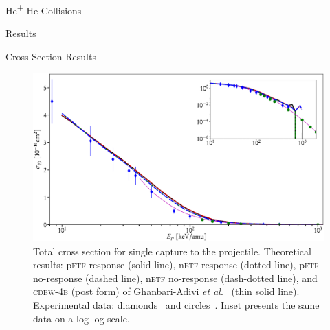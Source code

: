 \documentclass[a5paper, 9 pt]{extreport}
\begin{document}
\begin{chapter}{\texorpdfstring{He\textsuperscript{+}}{He+}-He Collisions \label{chap:hephe}}
\begin{section}{Results \label{sec:hephe-disc}}
\begin{subsection}{Cross Section Results \label{sec:hephe-res}}
         \begin{figure}[t]
            \centering
            \includegraphics[width = \linewidth]{./images/hephe-cross/HepHe-120.eps}
            \caption[Total cross section for single capture to the projectile He\textsuperscript{+}-He
                     collisions.]
                    {Total cross section for single capture to the projectile.
                     Theoretical results: p\textsc{etf} response (solid line), n\textsc{etf} response
                                          (dotted line), p\textsc{etf} no-response (dashed line),
                                          n\textsc{etf} no-response (dash-dotted line), and
                                          \textsc{cdbw-4b} (post form) of Ghanbari-Adivi
                                          \textit{et al}.~\cite{GAG15} (thin solid line).
                     Experimental data: diamonds~\cite{Dub-89} and circles~\cite{FTFHLP-95}.
                     Inset presents the same data on a log-log scale.
                     \label{fig:cs120}}
         \end{figure}


\end{subsection}
\end{section}
\end{chapter}
\end{document}
